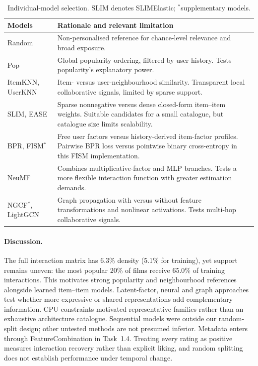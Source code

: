 \documentclass[12pt,a4paper]{article}   %
\begin{document}
\begin{table}[H]
\centering
\begin{tabular}{@{}p{0.2\linewidth}p{0.8\linewidth}@{}}
\toprule
Models & Rationale and relevant limitation \\
\midrule
Random & Non-personalised reference for chance-level relevance and broad exposure. \\
Pop & Global popularity ordering, filtered by user history. Tests popularity's explanatory power. \\
ItemKNN, UserKNN & Item- versus user-neighbourhood similarity. Transparent local collaborative signals, limited by sparse support. \\
SLIM, EASE & Sparse nonnegative versus dense closed-form item--item weights. Suitable candidates for a small catalogue, but catalogue size limits scalability. \\
BPR, FISM$^*$ & Free user factors versus history-derived item-factor profiles. Pairwise BPR loss versus pointwise binary cross-entropy in this FISM implementation. \\
NeuMF & Combines multiplicative-factor and MLP branches. Tests a more flexible interaction function with greater estimation demands. \\
NGCF$^*$, LightGCN & Graph propagation with versus without feature transformations and nonlinear activations. Tests multi-hop collaborative signals. \\
\bottomrule
\end{tabular}
\caption{Individual-model selection. SLIM denotes SLIMElastic; $^*$supplementary models.}
\label{tab:rationale}
\end{table}

\paragraph{Discussion.}
The full interaction matrix has 6.3\% density (5.1\% for training), yet support remains uneven: the most popular 20\% of films receive 65.0\% of training interactions. This motivates strong popularity and neighbourhood references alongside learned item--item models. Latent-factor, neural and graph approaches test whether more expressive or shared representations add complementary information. CPU constraints motivated representative families rather than an exhaustive architecture catalogue. Sequential models were outside our random-split design; other untested methods are not presumed inferior. Metadata enters through FeatureCombination in Task~1.4. Treating every rating as positive measures interaction recovery rather than explicit liking, and random splitting does not establish performance under temporal change.
\end{document}
